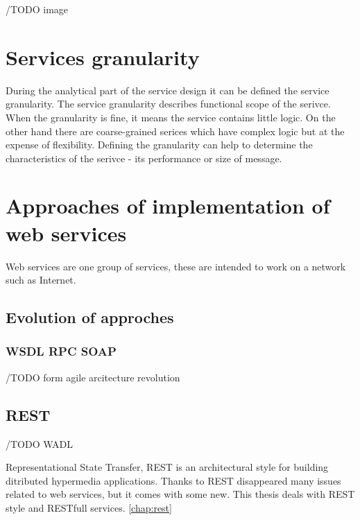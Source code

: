 /TODO image

\section{Services granularity}
\label{sec:granularity}
During the analytical part of the service design it can be defined the service granularity. The service granularity describes functional scope of the serivce. When the granularity is fine, it means the service contains little logic. On the other hand there are coarse-grained serices which have complex logic but at the expense of flexibility.
Defining the granularity can help to determine the characteristics of the serivce - its performance or size of message. \cite{soa-contract}

\section{Approaches of implementation of web services}
Web services are one group of services, these are intended to work on a network such as Internet.

\subsection{Evolution of approches}
\subsubsection{WSDL RPC SOAP} 
/TODO form agile arcitecture revolution
 
\subsection{REST}
/TODO WADL

Representational State Transfer, REST is an architectural style for building ditributed hypermedia applications.
Thanks to REST disappeared many issues related to web services, but it comes with some new. This thesis deals with REST style and RESTfull services. \ref{chap:rest}

    
